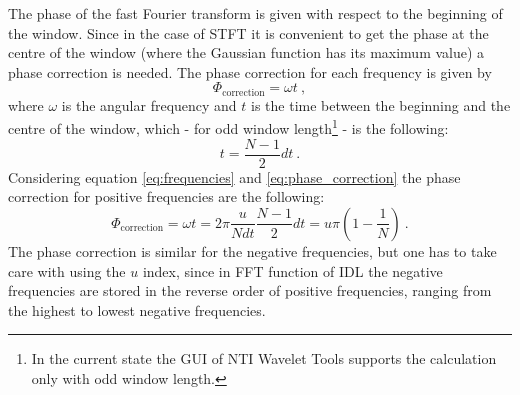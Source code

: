 \documentclass[a4paper,12pt,oneside]{article}
\newcommand{\Arg}{\Phi}
\begin{document}
The phase of the fast Fourier transform is given with respect to the beginning of the window. Since in the case of STFT it is convenient to get the phase at the centre of the window (where the Gaussian function has its maximum value) a phase correction is needed. The phase correction for each frequency is given by
\begin{equation}\label{eq:phase_correction}
  \Arg_{\textrm{correction}} = \omega t \ ,
\end{equation}
where $\omega$ is the angular frequency and $t$ is the time between the beginning and the centre of the window, which - for odd window length\footnote{In the current state the GUI of NTI Wavelet Tools supports the calculation only with odd window length.} - is the following:
$$t = \frac{N-1}{2} dt \ .$$
Considering equation \eqref{eq:frequencies} and \eqref{eq:phase_correction} the phase correction for positive frequencies are the following:
\begin{equation}\label{eq:phase_correction_positive}
  \Arg_{\textrm{correction}} = \omega t = 2\pi \frac{u}{N dt} \frac{N-1}{2} dt = u \pi \left(1 - \frac{1}{N} \right) \ .
\end{equation}
The phase correction is similar for the negative frequencies, but one has to take care with using the $u$ index, since in FFT function of IDL the negative frequencies are stored in the reverse order of positive frequencies, ranging from the highest to lowest negative frequencies.
\end{document}
